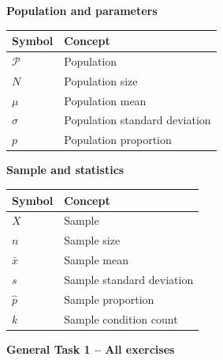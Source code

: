 \begingroup
\small
\setlength{\tabcolsep}{3pt}
\setlength{\extrarowheight}{0pt}
\setlength{\parskip}{0pt}
\renewcommand{\arraystretch}{1}
\newcommand{\pairedrow}{\strut}
\noindent\begin{minipage}[t]{.49\linewidth}
\vspace{0pt}
\textbf{Population and parameters}\par
\begin{tabularx}{\linewidth}{@{}>{\raggedright\arraybackslash}p{.18\linewidth}L@{}}
\toprule
\textbf{Symbol} & \textbf{Concept} \\
\midrule
$\mathcal{P}$\pairedrow & Population \\
$N$\pairedrow & Population size \\
$\mu$\pairedrow & Population mean \\
$\sigma$\pairedrow & Population standard deviation \\
$p$\pairedrow & Population proportion \\
\bottomrule
\end{tabularx}\par
\end{minipage}\hfill
\begin{minipage}[t]{.49\linewidth}
\vspace{0pt}
\textbf{Sample and statistics}\par
\begin{tabularx}{\linewidth}{@{}>{\raggedright\arraybackslash}p{.18\linewidth}L@{}}
\toprule
\textbf{Symbol} & \textbf{Concept} \\
\midrule
$X$\pairedrow & Sample \\
$n$\pairedrow & Sample size \\
$\bar{x}$\pairedrow & Sample mean \\
$s$\pairedrow & Sample standard deviation \\
$\hat{p}$\pairedrow & Sample proportion \\
$k$ & Sample condition count \\
\bottomrule
\end{tabularx}\par
\end{minipage}\par
\endgroup

\vspace{-3mm}
\begin{center}
    {\large\bfseries General Task 1 -- All exercises}
\end{center}
\vspace{-4mm}

